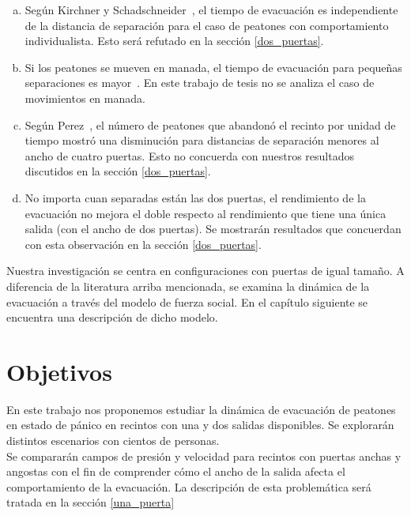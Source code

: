 \begin{enumerate}[(a)]

\item Según Kirchner y Schadschneider~\cite{kirchner1}, el tiempo de evacuación es independiente de la distancia de separación para el caso de peatones con comportamiento individualista. Esto será refutado en la sección \ref{dos_puertas}.

\item Si los peatones se mueven en manada, el tiempo de evacuación para pequeñas separaciones es mayor~\cite{kirchner1}. En este trabajo de tesis no se analiza el caso de movimientos en manada. 

\item Según Perez~\cite{perez1}, el número de peatones que abandonó el recinto por unidad de tiempo mostró una disminución para distancias de separación menores al ancho de cuatro puertas. Esto no concuerda con nuestros resultados discutidos en la sección \ref{dos_puertas}.

\item No importa cuan separadas están las dos puertas, el rendimiento de la evacuación no mejora el doble respecto al rendimiento que tiene una única salida (con el ancho de dos puertas). Se mostrarán resultados que concuerdan con esta observación en la sección \ref{dos_puertas}. 


\end{enumerate}


Nuestra investigación se centra en configuraciones con puertas de igual tamaño. A diferencia de la literatura arriba mencionada, se examina la dinámica de la evacuación a través del modelo de fuerza social. En el capítulo siguiente se encuentra una descripción de dicho modelo. \\

\newpage

\section{Objetivos}

En este trabajo nos proponemos estudiar la dinámica de evacuación de peatones en estado de pánico en recintos con una y dos salidas disponibles. Se explorarán distintos escenarios con cientos de personas.\\ 

Se compararán campos de presión y velocidad para recintos con puertas anchas y angostas con el fin de comprender cómo el ancho de la salida afecta el comportamiento de la evacuación. La descripción de esta problemática será tratada en la sección \ref{una_puerta}\\

